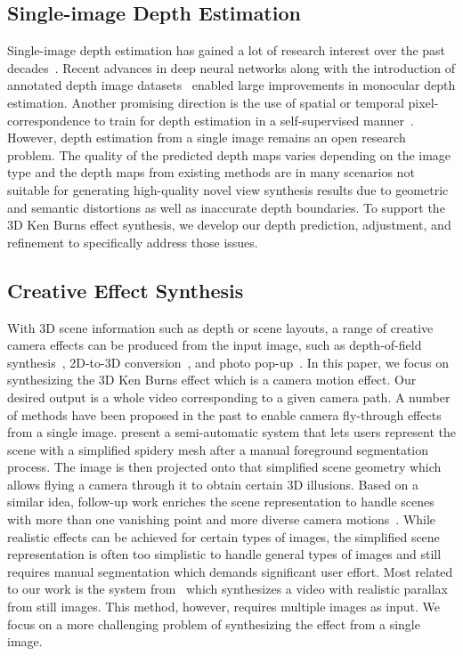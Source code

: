 \documentclass[acmtog,authorversion]{acmart}
\begin{document}
\subsection{Single-image Depth Estimation}

Single-image depth estimation has gained a lot of research interest over the past decades~\cite{Koch_ARXIV_2018}. Recent advances in deep neural networks along with the introduction of annotated depth image datasets~\cite{Abarghouei_CVPR_2018, Chen_NIPS_2016, Laina_OTHER_2016, Li_CVPR_2018, Saxena_PAMI_2009, Silberman_ECCV_2012, Xian_CVPR_2018, Zheng_OTHER_2018} enabled large improvements in monocular depth estimation. Another promising direction is the use of spatial or temporal pixel-correspondence to train for depth estimation in a self-supervised manner~\cite{Garg_ECCV_2016, Godard_CVPR_2017, Gordon_ARXIV_2019, Li_CVPR_2019, Luo_CVPR_2018, Ummenhofer_CVPR_2017, Zhou_CVPR_2017}. However, depth estimation from a single image remains an open research problem. The quality of the predicted depth maps varies depending on the image type and the depth maps from existing methods are in many scenarios not suitable for generating high-quality novel view synthesis results due to geometric and semantic distortions as well as inaccurate depth boundaries. To support the 3D Ken Burns effect synthesis, we develop our depth prediction, adjustment, and refinement to specifically address those issues.

\subsection{Creative Effect Synthesis}

With 3D scene information such as depth or scene layouts, a range of creative camera effects can be produced from the input image, such as depth-of-field synthesis~\cite{Wadhwa_TOG_2018, Wang_TOG_2018}, 2D-to-3D conversion~\cite{Xie_ECCV_2016}, and photo pop-up~\cite{Hoiem_TOG_2005, Srivastava_OTHER_2009}. In this paper, we focus on synthesizing the 3D Ken Burns effect which is a camera motion effect. Our desired output is a whole video corresponding to a given camera path. A number of methods have been proposed in the past to enable camera fly-through effects from a single image. \cite{Horry_OTHER_1997} present a semi-automatic system that lets users represent the scene with a simplified spidery mesh after a manual foreground segmentation process. The image is then projected onto that simplified scene geometry which allows flying a camera through it to obtain certain 3D illusions. Based on a similar idea, follow-up work enriches the scene representation to handle scenes with more than one vanishing point and more diverse camera motions~\cite{Kang_CGF_2001, Li_OTHER_2001}. While realistic effects can be achieved for certain types of images, the simplified scene representation is often too simplistic to handle general types of images and still requires manual segmentation which demands significant user effort. Most related to our work is the system from~\cite{Zheng_OTHER_2009} which synthesizes a video with realistic parallax from still images. This method, however, requires multiple images as input. We focus on a more challenging problem of synthesizing the effect from a single image.
\end{document}
